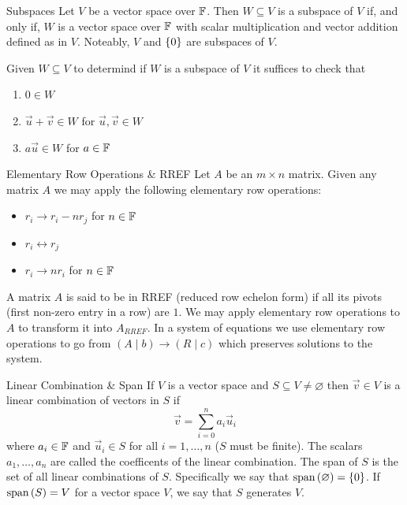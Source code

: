 \documentclass{exam}
\begin{document}
    \begin{defbox}{Subspaces}
        Let $V$ be a vector space over $\mathbb F$. Then $W \subseteq V$ is a subspace of $V$ if, and only if, $W$ is a vector space over $\mathbb F$ with scalar multiplication and vector addition defined as in $V$. Noteably, $V$ and $\left\{0 \right\}$ are subspaces of $V$.
    \end{defbox}

    Given $W \subseteq V$ to determind if $W$ is a subspace of $V$ it suffices to check that 
    \begin{enumerate}
        \item $0 \in W$
        \item $\vec{u} + \vec{v} \in W$ for $\vec{u}, \vec{v} \in W$
        \item $a\vec{u} \in W$ for $a \in \mathbb F$
    \end{enumerate}

    \begin{impbox}{Elementary Row Operations \& RREF}
        Let $A$ be an $m \times n$ matrix. Given any matrix $A$ we may apply the following elementary row operations:
        \begin{itemize}
            \item $r_i \to r_i - nr_j$ for $n \in \mathbb F$
            \item $r_i \leftrightarrow r_j$
            \item $r_i \to nr_i$ for $n \in \mathbb F$
        \end{itemize}
        A matrix $A$ is said to be in RREF (reduced row echelon form) if all its pivots (first non-zero entry in a row) are $1$. We may apply elementary row operations to $A$ to transform it into $A_{RREF}$. In a system of equations we use elementary row operations to go from $(A \mid b) \to (R \mid c)$ which preserves solutions to the system.
    \end{impbox}

    \begin{defbox}{Linear Combination \& Span}
        If $V$ is a vector space and $S \subseteq V \neq \varnothing$ then $\vec{v} \in V$ is a linear combination of vectors in $S$ if 
        \[
            \vec{v} = \sum_{i=0}^{n} a_i\vec{u}_i
        \]
        where $a_i \in \mathbb F$ and $\vec{u}_i \in S$ for all $i = 1, \dots, n$ ($S$ must be finite). The scalars $a_1, \dots, a_n$ are called the coefficents of the linear combination. The span of $S$ is the set of all linear combinations of $S$. Specifically we say that $\text{span}\left({\varnothing}\right) = \left\{0 \right\}$. If $\text{span}\left({S}\right) = V$ for a vector space $V$, we say that $S$ generates $V$.
    \end{defbox}
\end{document}
